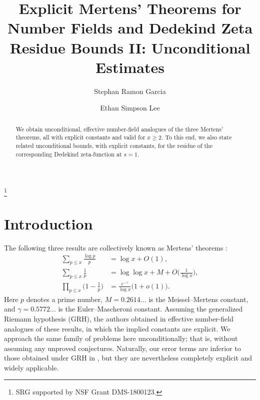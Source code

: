\documentclass[10pt,reqno]{amsart}
\theoremstyle{plain}
\theoremstyle{definition}
\begin{document}
\title[Explicit Mertens' Theorems for Number Fields II]{Explicit Mertens' Theorems for Number Fields and Dedekind Zeta Residue Bounds II: Unconditional Estimates}

	\author[S.R.~Garcia]{Stephan Ramon Garcia}
	\address{Department of Mathematics, Pomona College, 610 N. College Ave., Claremont, CA 91711} 
	
\author[E.S.~Lee]{Ethan Simpson Lee}
\address{School of Science, UNSW Canberra at the Australian Defence Force Academy, Northcott Drive, Campbell, ACT 2612} 
	
\thanks{SRG supported by NSF Grant DMS-1800123.}



\begin{abstract}
We obtain unconditional, effective number-field analogues of the three Mertens' theorems, all with explicit constants and valid for $x\geq 2$. To this end, we also state related unconditional bounds, with explicit constants, for the residue of the corresponding Dedekind zeta-function at $s=1$.
\end{abstract}

\maketitle


\section{Introduction}

The following three results are collectively known as Mertens' theorems \cite{Mertens}:
\begin{align*}
\sum_{p\leq x} \frac{\log p}{p} &= \log x + O(1), \\
\sum_{p \leq x} \frac{1}{p} &= \log \log x + M + O\bigg(\frac{1}{\log x} \bigg), \\
\prod_{p\leq x} \bigg(1 -\frac{1}{p} \bigg) &= \frac{e^{-\gamma}}{\log x} \big(1+o(1) \big).
\end{align*}
Here $p$ denotes a prime number, $M = 0.2614\ldots$ is the Meissel--Mertens constant, and $\gamma = 0.5772\ldots$ is the Euler--Mascheroni constant. 
Assuming the generalized Riemann hypothesis (GRH), 
the authors obtained in \cite{EMT4NF1} effective number-field analogues of these results, in which the implied constants are explicit.
We approach the same family of problems here unconditionally; that is, without assuming any unproved conjectures.
Naturally, our error terms are inferior to those obtained under GRH in \cite{EMT4NF1}, but they are nevertheless completely explicit and widely applicable.
\end{document}
